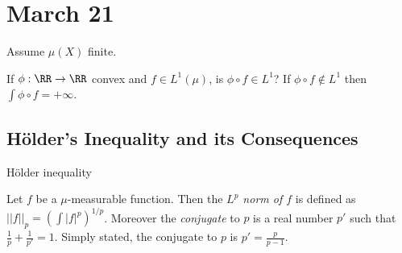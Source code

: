 \documentclass{../uva7310}
\begin{document}










\section{March 21}

Assume $\mu(X)$ finite.


If $\phi:\RR\rightarrow\RR$ convex and $f\in L^1(\mu)$, is $\phi\circ f\in L^1$? If $\phi\circ f\notin L^1$ then $\int \phi\circ f=+\infty$.


\subsection{H\"older's Inequality and its Consequences}

H\"older inequality

\begin{definition}
    Let $f$ be a $\mu$-measurable function. Then the \textit{$L^p$ norm of $f$} is defined as
    $||f||_p=\left(\int |f|^p\right)^{1/p}$. Moreover the \textit{conjugate} to $p$ is a real number
    $p'$ such that $\frac{1}{p}+\frac{1}{p'}=1$. Simply stated, the conjugate to $p$ is $p'=\frac{p}{p-1}$.
\end{definition}
\end{document}
